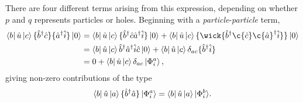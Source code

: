 	There are four different terms arising from this expression, depending on whether $p$ and $q$
	represents particles or holes. Beginning with a \emph{particle}-\emph{particle} term,
	\begin{equation}
		\begin{aligned}
			\bra{b} \hat{u} \ket{c} \{ \hat{b}^\dagger \hat{c} \} \{ \hat{a}^\dagger \hat{i} \} \ket{0} 
				&= \bra{b} \hat{u} \ket{c} \{ \hat{b}^\dagger \hat{c} \hat{a}^\dagger \hat{i} \} \ket{0}
				+	   \bra{b} \hat{u} \ket{c} \{\wick{  \hat{b}^\dagger  \c{\hat{c}}  \c{\hat{a}}^\dagger \hat{i} } \} \ket{0}\\
				&= \bra{b} \hat{u} \ket{c} \hat{b}^\dagger\hat{a}^\dagger\hat{i}\hat{c}\ket{0}
				+	  \bra{b} \hat{u} \ket{c} \delta_{ac}\{\hat{b}^\dagger \hat{i} \} \\
				&= 0 + \bra{b} \hat{u} \ket{c} \delta_{ac}\ket{\Phi_i^a},
		\end{aligned}
	\end{equation}
	giving non-zero contributions of the type
	\begin{equation}
		\bra{b} \hat{u} \ket{a} \{ \hat{b}^\dagger \hat{a} \} \ket{\Phi_i^a} 
			= \bra{b} \hat{u} \ket{a} \lvert \Phi_i^b \rangle.
	\end{equation}
	
